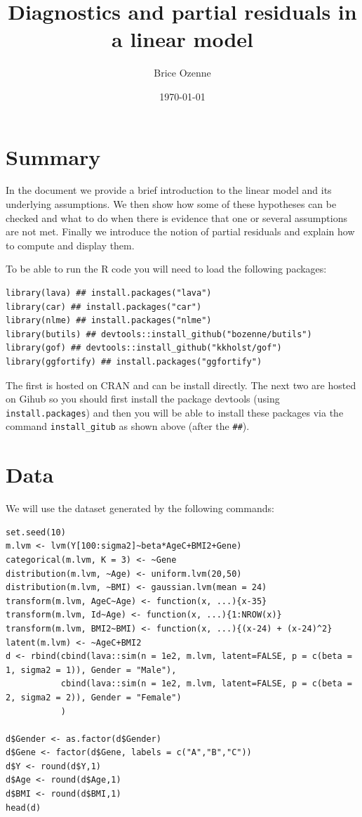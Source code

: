 \documentclass[12pt]{article}
\author{Brice Ozenne}
\date{\today}
\title{Diagnostics and partial residuals in a linear model}
\begin{document}
\maketitle

\section*{Summary}
\label{sec:orgfc8d9ca}
In the document we provide a brief introduction to the linear model
and its underlying assumptions. We then show how some of these
hypotheses can be checked and what to do when there is evidence that
one or several assumptions are not met. Finally we introduce the
notion of partial residuals and explain how to compute and display
them.

\bigskip

To be able to run the R code you will need to load the following
packages:
\lstset{language=r,label= ,caption= ,captionpos=b,numbers=none}
\begin{lstlisting}
library(lava) ## install.packages("lava")
library(car) ## install.packages("car")
library(nlme) ## install.packages("nlme")
library(butils) ## devtools::install_github("bozenne/butils")
library(gof) ## devtools::install_github("kkholst/gof")
library(ggfortify) ## install.packages("ggfortify")
\end{lstlisting}

The first is hosted on CRAN and can be install directly. The next two
are hosted on Gihub so you should first install the package devtools
(using \texttt{install.packages}) and then you will be able to install these
packages via the command \texttt{install\_gitub} as shown above (after the
\texttt{\#\#}).

\clearpage

\section{Data}
\label{sec:orge5398e8}

We will use the dataset generated by the following commands:

\lstset{language=r,label= ,caption= ,captionpos=b,numbers=none}
\begin{lstlisting}
set.seed(10)
m.lvm <- lvm(Y[100:sigma2]~beta*AgeC+BMI2+Gene)
categorical(m.lvm, K = 3) <- ~Gene
distribution(m.lvm, ~Age) <- uniform.lvm(20,50)
distribution(m.lvm, ~BMI) <- gaussian.lvm(mean = 24)
transform(m.lvm, AgeC~Age) <- function(x, ...){x-35}
transform(m.lvm, Id~Age) <- function(x, ...){1:NROW(x)}
transform(m.lvm, BMI2~BMI) <- function(x, ...){(x-24) + (x-24)^2}
latent(m.lvm) <- ~AgeC+BMI2
d <- rbind(cbind(lava::sim(n = 1e2, m.lvm, latent=FALSE, p = c(beta = 1, sigma2 = 1)), Gender = "Male"),
		   cbind(lava::sim(n = 1e2, m.lvm, latent=FALSE, p = c(beta = 2, sigma2 = 2)), Gender = "Female")
		   )

d$Gender <- as.factor(d$Gender)
d$Gene <- factor(d$Gene, labels = c("A","B","C"))
d$Y <- round(d$Y,1)
d$Age <- round(d$Age,1)
d$BMI <- round(d$BMI,1)
head(d)
\end{lstlisting}
\end{document}
